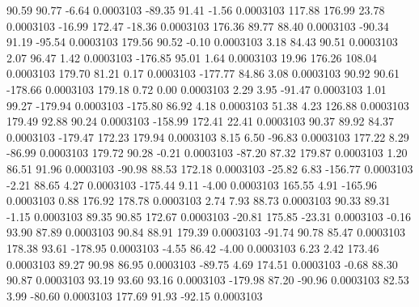        90.59       90.77       -6.64     0.0003103
      -89.35       91.41       -1.56     0.0003103
      117.88      176.99       23.78     0.0003103
      -16.99      172.47      -18.36     0.0003103
      176.36       89.77       88.40     0.0003103
      -90.34       91.19      -95.54     0.0003103
      179.56       90.52       -0.10     0.0003103
        3.18       84.43       90.51     0.0003103
        2.07       96.47        1.42     0.0003103
     -176.85       95.01        1.64     0.0003103
       19.96      176.26      108.04     0.0003103
      179.70       81.21        0.17     0.0003103
     -177.77       84.86        3.08     0.0003103
       90.92       90.61     -178.66     0.0003103
      179.18        0.72        0.00     0.0003103
        2.29        3.95      -91.47     0.0003103
        1.01       99.27     -179.94     0.0003103
     -175.80       86.92        4.18     0.0003103
       51.38        4.23      126.88     0.0003103
      179.49       92.88       90.24     0.0003103
     -158.99      172.41       22.41     0.0003103
       90.37       89.92       84.37     0.0003103
     -179.47      172.23      179.94     0.0003103
        8.15        6.50      -96.83     0.0003103
      177.22        8.29      -86.99     0.0003103
      179.72       90.28       -0.21     0.0003103
      -87.20       87.32      179.87     0.0003103
        1.20       86.51       91.96     0.0003103
      -90.98       88.53      172.18     0.0003103
      -25.82        6.83     -156.77     0.0003103
       -2.21       88.65        4.27     0.0003103
     -175.44        9.11       -4.00     0.0003103
      165.55        4.91     -165.96     0.0003103
        0.88      176.92      178.78     0.0003103
        2.74        7.93       88.73     0.0003103
       90.33       89.31       -1.15     0.0003103
       89.35       90.85      172.67     0.0003103
      -20.81      175.85      -23.31     0.0003103
       -0.16       93.90       87.89     0.0003103
       90.84       88.91      179.39     0.0003103
      -91.74       90.78       85.47     0.0003103
      178.38       93.61     -178.95     0.0003103
       -4.55       86.42       -4.00     0.0003103
        6.23        2.42      173.46     0.0003103
       89.27       90.98       86.95     0.0003103
      -89.75        4.69      174.51     0.0003103
       -0.68       88.30       90.87     0.0003103
       93.19       93.60       93.16     0.0003103
     -179.98       87.20      -90.96     0.0003103
       82.53        3.99      -80.60     0.0003103
      177.69       91.93      -92.15     0.0003103
